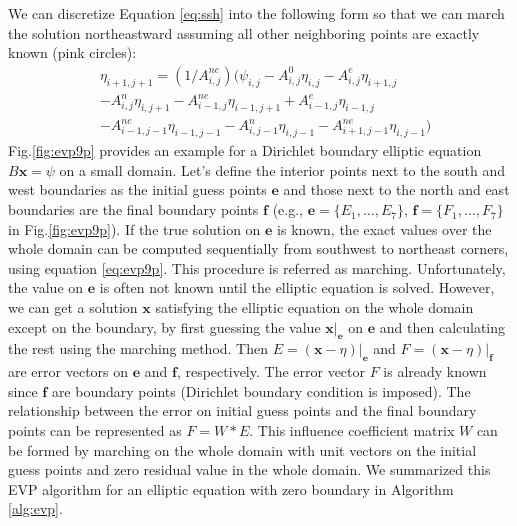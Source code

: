 We can discretize Equation \ref{eq:ssh} into the following form so that we can march the solution northeastward assuming all other neighboring points are exactly known (pink circles):
\begin{eqnarray}
\label{eq:evp9p}
&\eta_{i+1,j+1} = (1/A_{i,j}^{ne} )(\psi_{i,j} - A_{i,j}^0\eta_{i,j}-A_{i,j}^e\eta_{i+1,j} \nonumber\\
&-A_{i,j}^n\eta_{i,j+1}-A_{i-1,j}^{ne}\eta_{i-1,j+1} +A_{i-1,j}^e\eta_{i-1,j}\nonumber\\
&-A_{i-1,j-1}^{ne}\eta_{i-1,j-1}-A_{i,j-1}^n\eta_{i,j-1}- A_{i+1,j-1}^{ne}\eta_{i,j-1} )
\end{eqnarray}
Fig.\ref{fig:evp9p} provides an example for a Dirichlet boundary elliptic equation $B\textbf{x} = \psi$ on a small domain. 
Let's define the interior points next to the south and west boundaries
as the initial guess points $\textbf{e}$ and those next to the north and east boundaries are the final boundary points $\textbf{f}$
(e.g., $\textbf{e}= \{E_1, \dots, E_7\}$, $\textbf{f}= \{F_1, \dots, F_7\}$ in Fig.\ref{fig:evp9p}).
If the true solution on $\textbf{e}$ is known, the exact values over the whole domain can be computed
sequentially from southwest to northeast corners, using equation \ref{eq:evp9p}. This procedure is referred as marching. 
Unfortunately, the value on $\textbf{e}$ is often not known until the elliptic equation is solved. 
However, we can get a solution $\textbf{x}$ satisfying the elliptic equation on the whole domain except on the boundary,
by first guessing the value $\textbf{x}|_\textbf{e}$ on $\textbf{e}$ and then calculating the rest using the marching method. 
Then $E=(\textbf{x} -\eta)|_\textbf{e}$ and $F=(\textbf{x} -\eta)|_\textbf{f}$ are error vectors on $\textbf{e}$ and $\textbf{f}$, respectively. 
The error vector $F$ is already known since $\textbf{f}$ are boundary points (Dirichlet boundary condition is imposed).
The relationship between the error on initial guess points and the final boundary points can be represented as $F=W*E$. 
This influence coefficient matrix $W$ can be formed by marching on the whole domain with unit vectors on the initial guess points and zero residual value
in the whole domain. 
We summarized this EVP algorithm for an elliptic equation with zero boundary in Algorithm \ref{alg:evp}. 


